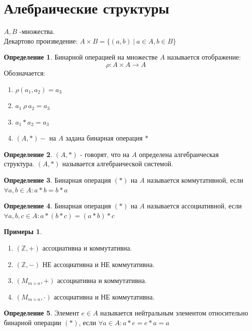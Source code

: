 \documentclass[a4paper, 12pt]{article}
\newcommand{\Z}{\mathbb Z}
\newcommand\tab[1][.5cm]{\hspace*{#1}}
\theoremstyle{definition}
\newtheorem*{definition}{Определение}
\newtheorem*{example}{Примеры}
\begin{document}
  \newpage
  
  \section{Алебраические структуры}
  $A,B$ -множества. \\
  Декартово произведение: $A \times B = \{(a,b)\ |\ a \in A, b \in B\}$ 
  \begin{definition}
    Бинарной операцией на множестве $A$ называется отображение: $$\rho:A \times A \to A$$ 
    Обозначается: \begin{enumerate}
      \item $\rho(a_1,a_2) = a_3$
      \item $a_1 \ \rho \ a_2 = a_3$
      \item $a_1 * a_2 = a_3$ 
      \item $(A, *) - $ на $A$ задана бинарная операция $*$ 
    \end{enumerate}
  \end{definition}    
  \begin{definition}
    $(A,*)$ - говорят, что на $A$ определена алгебраическая структура. $(A,*)$ называется алгебраической системой. 
  \end{definition} 
  \begin{definition}
    Бинарная операция $(*)$ на $A$ называется коммутативной, если $\forall a,b \in A: a*b=b*a$ 
  \end{definition} 
  \begin{definition}
    Бинарная операция $(*)$ на $A$ называется ассоциативной, если $\forall a,b,c \in A: a*(b*c)=(a*b)*c$ 
  \end{definition}
  \begin{example}
    \begin{enumerate} \tab
      \item $(\Z, +)$ ассоциативна и коммутативна. 
      \item $(\Z, -)$ НЕ ассоциативна и НЕ коммутативна.
      \item $(M_{m \times n}, +)$ ассоциативна и коммутативна.
      \item $(M_{m \times n}, \cdot)$ ассоциативна и НЕ коммутативна.
    \end{enumerate}
  \end{example}
  \begin{definition}
    Элемент $e \in A$ называется нейтральным элементом относительно бинарной операции $(*)$, если $\forall a \in A: a*e = e*a = a$ 
  \end{definition} 
\end{document}
